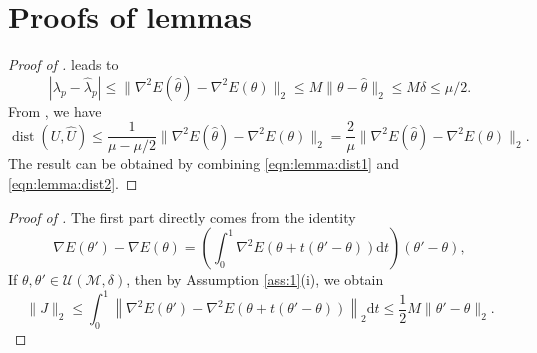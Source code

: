 \documentclass[final]{siamart251216}
\begin{document}
 

\appendix

\section{Proofs of lemmas}
\label{app}
\begin{proof}[Proof of ]
\cite[Theorem 8.1.5]{golub2013matrix} leads to
\begin{equation}\label{eqn:lemma:dist1}
|\lambda_p-\hat{\lambda}_p| \leqslant 
\|\nabla^2 E(\hat{\theta})-\nabla^2 E(\theta)\|_2 \leqslant
M\|\theta-\hat{\theta}\|_2 \leqslant
M\delta \leqslant \mu/2. 
\end{equation}
From \cite[Theorem 3.6]{stewart1990matrix}, we have
\begin{equation}\label{eqn:lemma:dist2}
\operatorname{dist}(U, \widehat{U}) \leqslant
\dfrac{1}{\mu-\mu/2} \|\nabla^2 E(\hat{\theta})-\nabla^2 E(\theta)\|_2=\dfrac{2}{\mu} \|\nabla^2 E(\hat{\theta})-\nabla^2 E(\theta)\|_2.
\end{equation}
The result can be obtained by combining \eqref{eqn:lemma:dist1} and \eqref{eqn:lemma:dist2}.
\end{proof}

\begin{proof}[Proof of ]
The first part directly comes from the identity
\begin{equation}\label{eqn:identity}
\nabla E(\theta')-\nabla E(\theta)=
\left(\int_{0}^{1}\nabla^{2}E\left(\theta+t(\theta'-\theta)\right) \mathrm{d}t\right)
\left(\theta'-\theta\right),
\end{equation}
If $\theta, \theta' \in \mathcal{U}(\mathcal{M},\delta)$, then by Assumption \ref{ass:1}(i), we obtain
\begin{equation*}
\|J\|_2
\leqslant\int_0^1 
\left\|\nabla^2E(\theta')-\nabla^2 E(\theta+t(\theta'-\theta))\right\|_2 \mathrm{d}t
\leqslant 
\frac{1}{2}M\|\theta'-\theta\|_2. 
\end{equation*}
\end{proof}
\end{document}
